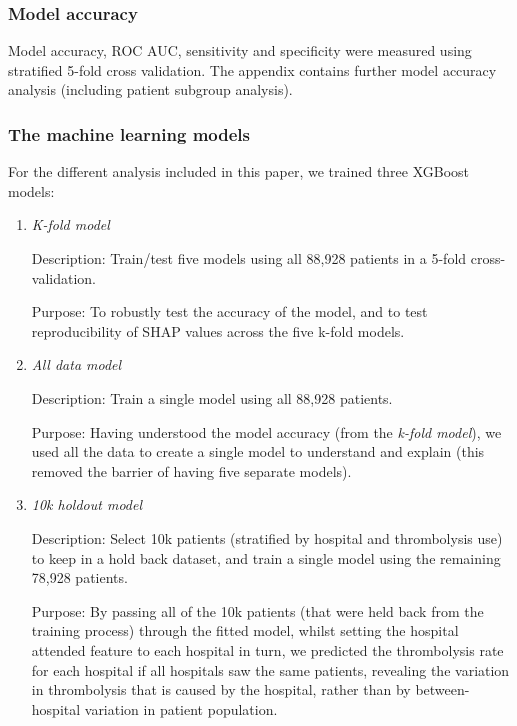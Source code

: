 \subsubsection{Model accuracy}
Model accuracy, ROC AUC, sensitivity and specificity were measured using stratified 5-fold cross validation. The appendix contains further model accuracy analysis (including patient subgroup analysis).

\subsubsection{The machine learning models}

For the different analysis included in this paper, we trained three XGBoost models:
\begin{enumerate}
    \item {\emph{K-fold model}}
    
    Description: Train/test five models using all 88,928 patients in a 5-fold cross-validation.
    
    Purpose: To robustly test the accuracy of the model, and to test reproducibility of SHAP values across the five k-fold models.%
    \item {\emph{All data model}}
    
    Description: Train a single model using all 88,928 patients.
    
    Purpose: Having understood the model accuracy (from the \emph{k-fold model}), we used all the data to create a single model to understand and explain (this removed the barrier of having five separate models).
    \item {\emph{10k holdout model}}

    Description: Select 10k patients (stratified by hospital and thrombolysis use) to keep in a hold back dataset, and train a single model using the remaining 78,928 patients. 
    
    Purpose: By passing all of the 10k patients (that were held back from the training process) through the fitted model, whilst setting the hospital attended feature to each hospital in turn, we predicted the thrombolysis rate for each hospital if all hospitals saw the same patients, revealing the variation in thrombolysis that is caused by the hospital, rather than by between-hospital variation in patient population.
\end{enumerate}


